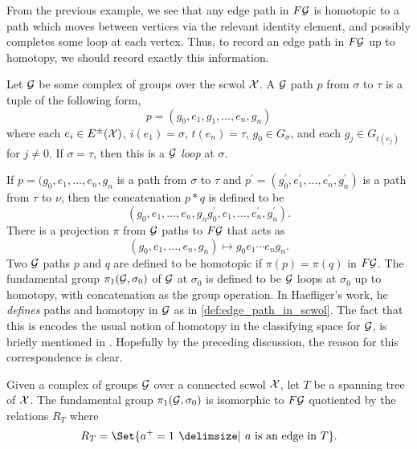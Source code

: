 From the previous example, we see that any edge path in $F\mathcal{G}$ is homotopic to a path which moves between vertices via the relevant identity element, and possibly completes some loop at each vertex.
Thus, to record an edge path in $F\mathcal{G}$ up to homotopy, we should record exactly this information.

\begin{definition}
	Let $\mathcal{G}$ be some complex of groups over the scwol $\mathcal{X}$.
	A $\mathcal{G}$ path $p$ from $\sigma$ to  $\tau$ is a tuple of the following form,
	\[
		p = (g_0, e_1, g_1, \ldots ,e_n, g_n)
	\]
	where each $e_i \in E^\pm(\mathcal{X})$, $i(e_1) = \sigma$, $t(e_n)=\tau$, $g_0 \in G_\sigma$, and each $g_j \in G_{t(e_j)}$ for  $j \neq 0$.
	If $\sigma=\tau$, then this is a \emph{ $\mathcal{G}$ loop} at  $\sigma$.
	\label{def:paths_in_complexes_of_groups}
\end{definition}

If $p = (g_0, e_1, \ldots, e_n, g_n$ is a path from $\sigma$ to  $\tau$ and  $p^\prime = (g^\prime_0, e^\prime_1, \ldots, e^\prime_n, g^\prime_n)$ is a path from $\tau$ to $\nu$, then the concatenation  $p \ast q$ is defined to be
\[
	(g_0, e_1, \ldots, e_n, g_ng^\prime_0, e_1, \ldots, e^\prime_n, g^\prime_n)
	.\]
There is a projection $\pi$ from $\mathcal{G}$ paths to $F\mathcal{G}$ that acts as
\[
	(g_0, e_1, \ldots, e_n, g_n) \mapsto g_0e_1\cdots e_ng_n
	.\]
Two $\mathcal{G}$ paths  $p$ and $q$ are defined to be homotopic if $\pi(p) = \pi(q)$ in $F\mathcal{G}$.
The fundamental group $\pi_1(\mathcal{G}, \sigma_0)$ of $\mathcal{G}$ at $\sigma_0$ is defined to be $\mathcal{G}$ loops at  $\sigma_0$ up to homotopy, with concatenation as the group operation.
In Haefliger's work, he \emph{defines} paths and homotopy in $\mathcal{G}$ as in \cref{def:edge_path_in_scwol}.
The fact that this is encodes the usual notion of homotopy in the classifying space for $\mathcal{G}$, is briefly mentioned in \cite[Section 3.1.a]{haefliger_complexes_1991}.
Hopefully by the preceding discussion, the reason for this correspondence is clear.
\begin{theorem}
	Given a complex of groups $\mathcal{G}$ over a connected scwol  $\mathcal{X}$, let $T$ be a spanning tree of  $\mathcal{X}$.
	The fundamental group  $\pi_1(\mathcal{G}, \sigma_0)$ is isomorphic to $F\mathcal{G}$ quotiented by the relations  $R_T$ where
	\[
		R_T = \Set{a^+ = 1 \given a \text{ is an edge in } T}
		.\]
\end{theorem}

